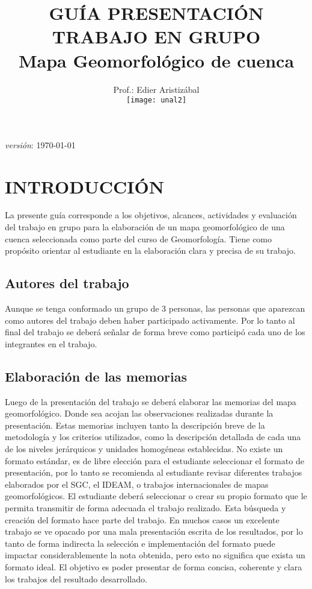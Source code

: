 \documentclass[twoside,11pt,]{article}
\title {GUÍA PRESENTACIÓN TRABAJO EN GRUPO\\ Mapa Geomorfológico de cuenca}
\author{Prof.: Edier Aristizábal\\[5ex]
\texttt{[image: unal2]}
}
\date{}
\begin{document}
\maketitle

\emph {versión}: \today

\section*{INTRODUCCIÓN}
La presente guía corresponde a los objetivos, alcances, actividades y evaluación del trabajo en grupo para la elaboración de un mapa geomorfológico de una cuenca seleccionada como parte del curso de Geomorfología. Tiene como propósito orientar al estudiante en la elaboración clara y precisa de su trabajo.

\subsection{Autores del trabajo} 
Aunque se tenga conformado un grupo de 3 personas, las personas que aparezcan como autores del trabajo deben haber participado activamente. Por lo tanto al final del trabajo se deberá señalar de forma breve como participó cada uno de los integrantes en el trabajo.

\subsection{Elaboración de las memorias}
Luego de la presentación del trabajo se deberá elaborar las memorias del mapa geomorfológico. Donde sea acojan las observaciones realizadas durante la presentación. Estas memorias incluyen tanto la descripción breve de la metodología y los criterios utilizados, como la descripción detallada de cada una de los niveles jerárquicos y unidades homogéneas establecidas. No existe un formato estándar, es de libre elección para el estudiante seleccionar el formato de presentación, por lo tanto se recomienda al estudiante revisar diferentes trabajos elaborados por el SGC, el IDEAM, o trabajos internacionales de mapas geomorfológicos. El estudiante deberá seleccionar o crear su propio formato que le permita transmitir de forma adecuada el trabajo realizado. Esta búsqueda y creación del formato hace parte del trabajo. En muchos casos un excelente trabajo se ve opacado por una mala presentación escrita de los resultados, por lo tanto de forma indirecta la selección e implementación del formato puede impactar considerablemente la nota obtenida, pero esto no significa que exista un formato ideal. El objetivo es poder presentar de forma concisa, coherente y clara los trabajos del resultado desarrollado.
\end{document}
